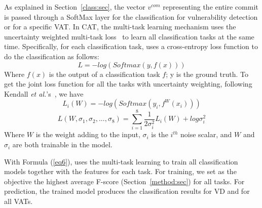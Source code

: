 As explained in Section~\ref{class:sec}, the vector $v^{com}$
representing the entire commit is passed through a SoftMax layer for
the classification for vulnerability detection or for a specific VAT.
In CAT, the multi-task learning mechanism uses the uncertainty
weighted multi-task loss~\cite{kendall2018multi} to learn all 
classification tasks at the same time. Specifically, for each
classification task, \tool uses a cross-entropy loss function to do
the classification as follows:
\begin{equation}\label{eq4}
	L = -log(Softmax(y, f(x)))
\end{equation}
Where $f(x)$ is the output of a classification task $f$; y is the
ground truth. To get the joint loss function for all the tasks with
uncertainty weighting, following Kendall {\em et
  al.}'s~\cite{kendall2018multi}, we have
\begin{equation}\label{eq5}
	L_i(W) = -log(Softmax(y_i, f^W(x_i)))
\end{equation}
\begin{equation}\label{eq6}
	L(W, \sigma_1, \sigma_2, ..., \sigma_8) = \sum_{i=1}^8\frac{1}{2\sigma_i^2}L_i(W) + log \sigma^2_i
\end{equation}
Where $W$ is the weight adding to the input, $\sigma_i$ is the
$i^{th}$ noise scalar, and $W$ and $\sigma_i$ are both trainable in
the model.

With Formula (\ref{eq6}), {\tool} uses the multi-task
learning to train all classification models together with the
features for each task. For training, we set as the objective the
highest average F-score (Section~\ref{method:sec}) for all
tasks. For prediction, the trained model produces the
classification results for VD and for all VATs.



